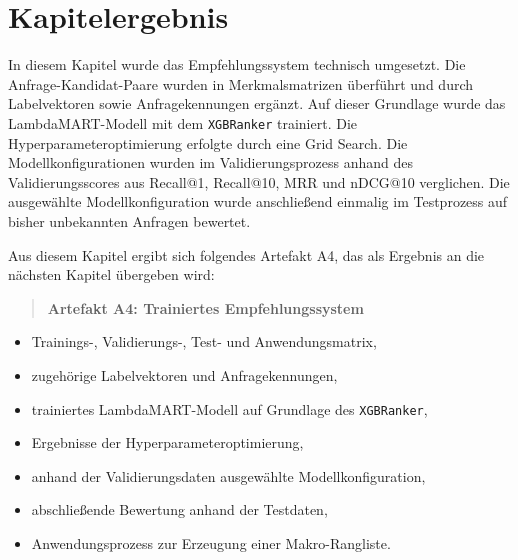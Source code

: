 \section{Kapitelergebnis} 
\label{sec:kapitelergebnis_technische_umsetzung} 

In diesem Kapitel wurde das Empfehlungssystem technisch umgesetzt. Die Anfrage-Kandidat-Paare wurden in Merkmalsmatrizen überführt und durch Labelvektoren sowie Anfragekennungen ergänzt. 
Auf dieser Grundlage wurde das LambdaMART-Modell mit dem \texttt{XGBRanker} trainiert. Die Hyperparameteroptimierung erfolgte durch eine Grid Search. 
Die Modellkonfigurationen wurden im Validierungsprozess anhand des Validierungsscores aus Recall@1, Recall@10, MRR und nDCG@10 verglichen. 
Die ausgewählte Modellkonfiguration wurde anschließend einmalig im Testprozess auf bisher unbekannten Anfragen bewertet.

Aus diesem Kapitel ergibt sich folgendes Artefakt A4, das als Ergebnis an die nächsten Kapitel übergeben wird:

\begin{quote} 
    \textbf{Artefakt A4: Trainiertes Empfehlungssystem} 
\end{quote} 
\begin{itemize} 
    \item Trainings-, Validierungs-, Test- und Anwendungsmatrix, 
    \item zugehörige Labelvektoren und Anfragekennungen, 
    \item trainiertes LambdaMART-Modell auf Grundlage des \texttt{XGBRanker}, 
    \item Ergebnisse der Hyperparameteroptimierung, 
    \item anhand der Validierungsdaten ausgewählte Modellkonfiguration, 
    \item abschließende Bewertung anhand der Testdaten, 
    \item Anwendungsprozess zur Erzeugung einer Makro-Rangliste. 
\end{itemize}
